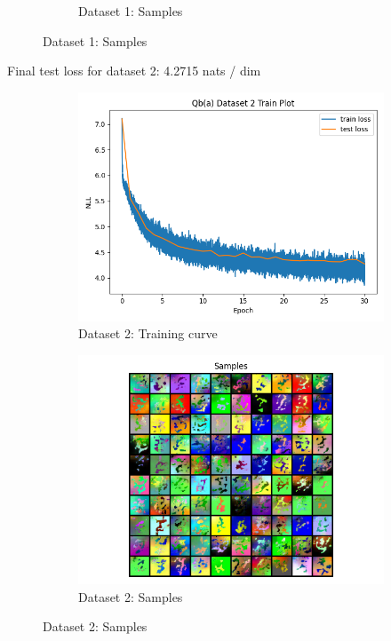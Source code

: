 \documentclass{article}
\begin{document}
\begin{enumerate}[(a)]
\begin{figure}[H]
\begin{subfigure}{0.45\textwidth}
        \caption{Dataset 1: Samples}
    \end{subfigure}
\end{figure}
Final test loss for dataset 2: 4.2715 nats / dim
\begin{figure}[H]
    \centering
    \begin{subfigure}{0.45\textwidth}
        \centering
        \includegraphics[width=\textwidth]{figures/q4_b_dset2_train_plot.png}
        \caption{Dataset 2: Training curve}
    \end{subfigure}
    \hspace{0.2in}
    \begin{subfigure}{0.45\textwidth}
        \centering
        \includegraphics[width=\textwidth]{figures/q4_b_dset2_samples.png}
        \caption{Dataset 2: Samples}
    \end{subfigure}
\end{figure}

\end{enumerate}
\end{document}
